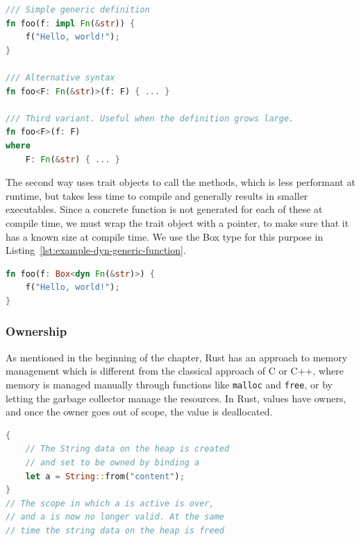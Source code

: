 \documentclass{article}
\begin{document}
\begin{lstlisting}[language=Rust, style=boxed, caption=Variants of defining a generic function, label=lst:example-generic-functions]
/// Simple generic definition
fn foo(f: impl Fn(&str)) {
    f("Hello, world!");
}

/// Alternative syntax
fn foo<F: Fn(&str)>(f: F) { ... }

/// Third variant. Useful when the definition grows large.
fn foo<F>(f: F) 
where 
    F: Fn(&str) { ... }
\end{lstlisting}

The second way uses trait objects to call the methods, which is less performant at runtime, but takes less time to compile and generally results in smaller executables. Since a concrete function is not generated for each of these at compile time, we must wrap the trait object with a pointer, to make sure that it has a known size at compile time. We use the Box type for this purpose in Listing~\ref{lst:example-dyn-generic-function}.

\begin{lstlisting}[language=Rust, style=boxed, caption=A function which will remain generic at runtime. It can be rewritten in the same stly as the other two variants in Listing~\ref{lst:example-generic-functions}, label=lst:example-dyn-generic-function]
fn foo(f: Box<dyn Fn(&str)>) {
    f("Hello, world!");
}
\end{lstlisting}

\subsubsection{Ownership}
As mentioned in the beginning of the chapter, Rust has an approach to memory management which is different from the classical approach of C or C++, where memory is managed manually through functions like \lstinline{malloc} and \lstinline{free}, or by letting the garbage collector manage the resources. In Rust, values have owners, and once the owner goes out of scope, the value is deallocated.
\begin{lstlisting}[language=Rust, style=boxed, caption=Heap data owned by binding, label=lst:example-ownership]
{
    // The String data on the heap is created
    // and set to be owned by binding a
    let a = String::from("content"); 
}
// The scope in which a is active is over,
// and a is now no longer valid. At the same
// time the string data on the heap is freed
\end{lstlisting}
\end{document}
